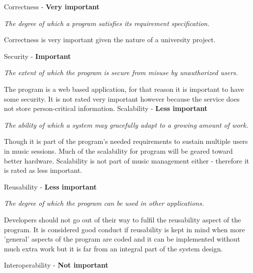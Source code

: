 \vspace{5 mm}
\noindent
Correctness - \textbf{Very important}

\vspace{5 mm}
\noindent
\textit{The degree of which a program satisfies its requirement specification.}

\vspace{5 mm}
\noindent
Correctness is very important given the nature of a university project. 

\vspace{5 mm}
\noindent
Security - \textbf{Important}

\vspace{5 mm}
\noindent
\textit{The extent of which the program is secure from misuse by unauthorized users.}

\vspace{5 mm}
\noindent
The program is a web based application, for that reason it is important to have some security. It is not rated very important however because the service does not store person-critical information.
\newpage
Scalability - \textbf{Less important}

\vspace{5 mm}
\noindent
\textit{The ability of which a system may gracefully adapt to a growing amount of work.}

\vspace{5 mm}
\noindent
Though it is part of the program's needed requirements to sustain multiple users in music sessions. Much of the scalability for program will be geared toward better hardware. Scalability is not part of music management either - therefore it is rated as less important.

\vspace{5 mm}
\noindent
Reusability - \textbf{Less important}

\vspace{5 mm}
\noindent
\textit{The degree of which the program can be used in other applications.}

\vspace{5 mm}
\noindent
Developers should not go out of their way to fulfil the reusability aspect of the program. It is considered good conduct if reusability is kept in mind when more 'general' aspects of the program are coded and it can be implemented without much extra work but it is far from an integral part of the system design.

\vspace{5 mm}
\noindent
Interoperability - \textbf{Not important}

